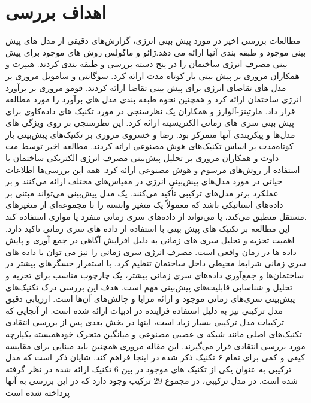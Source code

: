 \section[اهداف بررسی]{اهداف بررسی\cite{DEB2017902}}
مطالعات بررسی اخیر در مورد پیش بینی انرژی، گزارش‌های دقیقی از مدل های پیش بینی موجود و طبقه بندی آنها ارائه می دهد.ژائو  و ماگولس روش های موجود برای پیش بینی مصرف انرژی ساختمان را در پنج دسته بررسی و طبقه بندی کردند. هیپرت و همکاران مروری بر پیش بینی بار کوتاه مدت ارائه کرد. سوگانتی و ساموئل مروری بر مدل های تقاضای انرژی برای پیش بینی تقاضا ارائه کردند. فومو مروری بر برآورد انرژی ساختمان ارائه کرد و همچنین نحوه طبقه بندی مدل های برآورد را مورد مطالعه قرار داد. مارتینز-آلوارز و همکاران یک نظرسنجی در مورد تکنیک های داده‌کاوی برای پیش بینی سری های زمانی الکتریسیته ارائه کرد. این نظرسنجی بر روی ویژگی های مدل‌ها و پیکربندی آنها متمرکز بود. رضا و خسروی مروری بر تکنیک‌های پیش‌بینی بار کوتاه‌مدت بر اساس تکنیک‌های هوش مصنوعی ارائه کردند. مطالعه اخیر توسط مت داوت و همکاران مروری بر تحلیل پیش‌بینی مصرف انرژی الکتریکی ساختمان با استفاده از روش‌های مرسوم و هوش مصنوعی ارائه کرد. 
همه این بررسی‌ها اطلاعات حیاتی در مورد مدل‌های پیش‌بینی انرژی در مقیاس‌های مختلف ارائه می‌کنند و بر عملکرد برتر مدل‌های ترکیبی تأکید می‌کنند. یک مدل پیش‌بینی می‌تواند مبتنی بر داده‌های استاتیکی باشد که معمولاً یک متغیر وابسته را با مجموعه‌ای از متغیرهای مستقل منطبق می‌کند، یا می‌تواند از داده‌های سری زمانی منفرد یا موازی استفاده کند. 
\\
این مطالعه بر تکنیک های پیش بینی با استفاده از داده های سری زمانی تاکید دارد. اهمیت تجزیه و تحلیل سری های زمانی به دلیل افزایش آگاهی در جمع آوری و پایش داده ها در زمان واقعی است. مصرف انرژی سری زمانی را نیز می توان با داده های سری زمانی شرایط محیطی داخل ساختمان تنظیم کرد. با استقرار حسگرهای بیشتر در ساختمان‌ها و جمع‌آوری داده‌های سری زمانی بیشتر، یک چارچوب مناسب برای تجزیه و تحلیل و شناسایی قابلیت‌های پیش‌بینی مهم است. هدف این بررسی درک تکنیک‌های پیش‌بینی سری‌های زمانی موجود و ارائه مزایا و چالش‌های آن‌ها است. ارزیابی دقیق مدل ترکیبی نیز به دلیل استفاده فزاینده در ادبیات ارائه شده است. از آنجایی که ترکیبات مدل ترکیبی بسیار زیاد است، اینها در بخش بعدی پس از بررسی انتقادی تکنیک‌های اصلی مانند شبکه ی عصبی مصنوعی و میانگین متحرک خودهمبسته یکپارچه مورد بررسی انتقادی قرار می‌گیرند. این مقاله مروری همچنین باید مبنایی برای مقایسه کیفی و کمی برای تمام ۶ تکنیک ذکر شده در اینجا فراهم کند. شایان ذکر است که مدل ترکیبی به عنوان یکی از تکنیک های موجود در بین 6 تکنیک ارائه شده در نظر گرفته شده است. در مدل ترکیبی، در مجموع 29 ترکیب وجود دارد که در این بررسی به آنها پرداخته شده است
